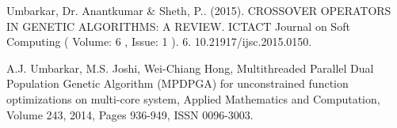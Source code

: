 
\newpage
\begin{thebibliography}{0}
		
		 Umbarkar, Dr. Anantkumar \& Sheth, P.. (2015). CROSSOVER OPERATORS IN GENETIC ALGORITHMS: A REVIEW. ICTACT Journal on Soft Computing ( Volume: 6 , Issue: 1 ). 6. 10.21917/ijsc.2015.0150.
		
		 A.J. Umbarkar, M.S. Joshi, Wei-Chiang Hong,
		Multithreaded Parallel Dual Population Genetic Algorithm (MPDPGA) for unconstrained function optimizations on multi-core system,
		Applied Mathematics and Computation,
		Volume 243, 2014, Pages 936-949,
		ISSN 0096-3003.

		
		
		
		
	\end{thebibliography}
